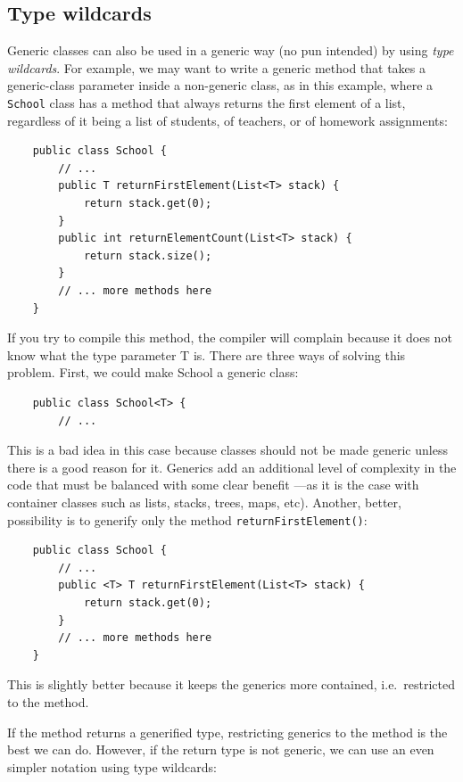 \subsection{Type wildcards}
\label{sec:type-wildcards}

Generic classes can also be used in a generic way (no pun
intended) by using \emph{type wildcards}. 
For example, we may want to write a generic method 
that takes a generic-class parameter inside a non-generic class, 
as in this example, where a
\verb+School+ class has a method that always returns the first element
of a list, regardless of it being a list of students, of teachers, or of
homework assignments: 

\begin{verbatim}
    public class School {
        // ...
        public T returnFirstElement(List<T> stack) {
            return stack.get(0); 
        }
        public int returnElementCount(List<T> stack) {
            return stack.size();
        }
        // ... more methods here
    }
\end{verbatim}

If you try to compile this method, the compiler will complain because
it does not know what the type parameter T is. There are three ways of
solving this problem. First, we could make School a generic class: 

\begin{verbatim}
    public class School<T> {
        // ...
\end{verbatim}

This is a bad idea in this case because classes 
should not be made generic unless there is
a good reason for it. Generics add an additional level of complexity in the
code that must be balanced with some clear benefit ---as it 
is the case with
container classes such as lists, stacks, trees, maps, etc). Another,
better, possibility is to generify only the method
\verb+returnFirstElement()+: 

\begin{verbatim}
    public class School {
        // ...
        public <T> T returnFirstElement(List<T> stack) {
            return stack.get(0); 
        }
        // ... more methods here
    }
\end{verbatim}

This is slightly better because it keeps the generics more
contained, i.e.~restricted to the method. 

If the method returns a generified type, restricting generics to the
method is the best
we can do. However, if the return type is not generic, 
we can use an even simpler notation using type wildcards: 

